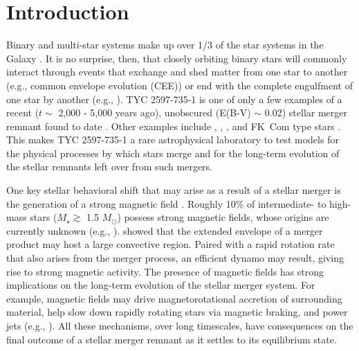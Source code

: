 \documentclass[linenumbers]{aastex631}
\begin{document}
\section{Introduction} \label{sec:intro}
Binary and multi-star systems make up over 1/3 of the star systems in the Galaxy \citep{Raghavan+2010}. It is no surprise, then, that closely orbiting binary stars will commonly interact through events that exchange and shed matter from one star to another (e.g., common envelope evolution (CEE)) or end with the complete engulfment of one star by another (e.g., \citealt{Ivanova+2013}). TYC 2597-735-1 is one of only a few examples of a recent ($t \sim$ 2,000 - 5,000 years ago), unobscured (E(B-V) $\sim$ 0.02) stellar merger remnant found to date \citep{2020Natur.587..387H}.
Other examples include  \citep{2003ApJ...582.1032J},  \citep{Zuckerman_2008},  \citep{Melis_2009}, and FK~Com type stars \citep[see, e.g.,][for a very detailed study of FK Com itself]{2016ApJS..223....5A}.
This makes TYC 2597-735-1 a rare astrophysical laboratory to test models for the physical processes by which stars merge and for the long-term evolution of the stellar remnants left over from such mergers.

One key stellar behavioral shift that may arise as a result of a stellar merger is the generation of a strong magnetic field \citep{Schneider+2016}. Roughly 10\% of intermediate- to high-mass stars ($M_{\star} \gtrsim$ 1.5 $M_{\odot}$) possess strong magnetic fields, whose origins are currently unknown (e.g., \citealt{Donati+2009,Fossati+2015,Grunhut+2017}). \citet{Soker&Tylenda2007} showed that the extended envelope of a merger product may host a large convective region. Paired with a rapid rotation rate that also arises from the merger process, an efficient dynamo may result, giving rise to strong magnetic activity. The presence of magnetic fields has strong implications on the long-term evolution of the stellar merger system. For example, magnetic fields may drive magnetorotational accretion of surrounding material, help slow down rapidly rotating stars via magnetic braking, and power jets (e.g., \citealt{Schneider+2020}). All these mechanisms, over long timescales, have consequences on the final outcome of a stellar merger remnant as it settles to its equilibrium state.
\end{document}
